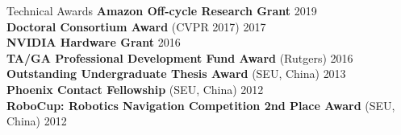 \documentclass{resume} %
\begin{document}
\begin{rSection}{Technical Awards}
{\bf Amazon Off-cycle Research Grant} \hfill {2019} \\
{\bf Doctoral Consortium Award} (CVPR 2017) \hfill {2017} \\
{\bf NVIDIA Hardware Grant} \hfill{2016} \\
{\bf TA/GA Professional Development Fund Award} (Rutgers) \hfill {2016}\\ 
{\bf Outstanding Undergraduate Thesis Award} (SEU, China) \hfill {2013}\\
{\bf Phoenix Contact Fellowship} (SEU, China) \hfill {2012} \\
{\bf RoboCup: Robotics Navigation Competition 2nd Place Award} (SEU, China) \hfill {2012}

\end{rSection}
\end{document}
